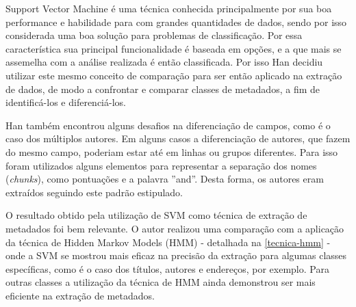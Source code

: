 \begin{textonovo}
Support Vector Machine é uma técnica conhecida principalmente por sua boa performance e habilidade para com grandes quantidades de dados, sendo por isso considerada uma boa solução para problemas de classificação. Por essa característica sua principal funcionalidade é baseada em opções, e a que mais se assemelha com a análise realizada é então classificada. Por isso Han \cite{Han-SVM} decidiu utilizar este mesmo conceito de comparação para ser então aplicado na extração de dados, de modo a confrontar e comparar classes de metadados, a fim de identificá-los e diferenciá-los.

Han também encontrou alguns desafios na diferenciação de campos, como é o caso dos múltiplos autores. Em alguns casos a diferenciação de autores, que fazem do mesmo campo, poderiam estar até em linhas ou grupos diferentes. Para isso foram utilizados alguns elementos para representar a separação dos nomes (\textit{chunks}), como pontuações e a palavra ''and''. Desta forma, os autores eram extraídos seguindo este padrão estipulado.

O resultado obtido pela utilização de SVM como técnica de extração de metadados foi bem relevante. O autor realizou uma comparação com a aplicação da técnica de Hidden Markov Models (HMM) - detalhada na \autoref{tecnica-hmm} - onde a SVM se mostrou mais eficaz na precisão da extração para algumas classes específicas, como é o caso dos títulos, autores e endereços, por exemplo. Para outras classes a utilização da técnica de HMM ainda demonstrou ser mais eficiente na extração de metadados.

\end{textonovo}




